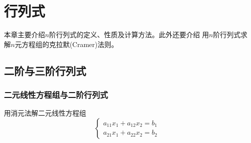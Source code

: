 


\chapter{行列式}
本章主要介绍$n$阶行列式的定义、性质及计算方法。此外还要介绍
用$n$阶行列式求解$n$元方程组的克拉默(Cramer)法则。
\section{二阶与三阶行列式}
\subsection{二元线性方程组与二阶行列式}
用消元法解二元线性方程组
\begin{equation}
  \label{equ:one}
\begin{cases}
  a_{11}x_1+a_{12}x_2 = b_1\\
  a_{21} x_1+a_{22}x_2 = b_2
\end{cases}
\end{equation}

